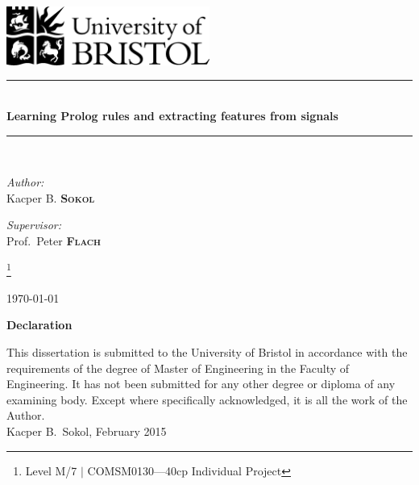 \documentclass[12pt, a4paper, pdflatex, leqno, twoside]{report}
\newcommand{\HRule}{\rule{\linewidth}{0.5mm}}
\begin{document}
\begin{titlepage}
  \begin{center}
\includegraphics[width=0.5\textwidth]{gfx/UOB-logo.png}~\\[2.5cm]

\HRule \\[0.4cm]
{\huge \bfseries
  Learning Prolog rules and extracting features from signals\\[0.4cm]
}
\HRule \\[1.5cm]

    \begin{minipage}{0.4\textwidth}
      \begin{flushleft} \large
\emph{Author:}\\
Kacper B. \textsc{\textbf{Sokol}}
      \end{flushleft}
    \end{minipage}
    \begin{minipage}{0.4\textwidth}
      \begin{flushright} \large
\emph{Supervisor:} \\
Prof.\ Peter \textsc{\textbf{Flach}}
      \end{flushright}
    \end{minipage}

\let\thefootnote\relax\footnote{\hspace*{-1.7em}Level M/7 $|$ COMSM0130---40cp Individual Project}

\vfill %
{\large \today}
  \end{center}
\end{titlepage}

\newpage
\thispagestyle{empty}
\mbox{}

\newpage
\thispagestyle{empty}
\mbox{}

\begin{center}\textbf{Declaration}\\[1em]\end{center}
This dissertation is submitted to the University of Bristol in accordance with the requirements of the degree of Master of Engineering in the Faculty of Engineering. It has not been submitted for any other degree or diploma of any examining body. Except where specifically acknowledged, it is all the work of the Author.\\[1.5cm]
Kacper B.\ Sokol, February 2015
\end{document}
